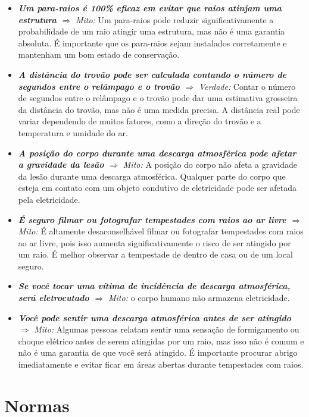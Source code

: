 \documentclass[a4paper, 12pt, onecolumn,singlespacing]{article}
\begin{document}
\begin{itemize}
		\item \textbf{\textit{Um para-raios é 100\% eficaz em evitar que raios atinjam uma estrutura $\Rightarrow$}}
		\textit{Mito:} Um para-raios pode reduzir significativamente a probabilidade de um raio atingir uma estrutura, mas não é uma garantia absoluta. É importante que os para-raios sejam instalados corretamente e mantenham um bom estado de conservação.
		
		\item \textbf{\textit{A distância do trovão pode ser calculada contando o número de segundos entre o relâmpago e o trovão $\Rightarrow$}}	\textit{Verdade: }Contar o número de segundos entre o relâmpago e o trovão pode dar uma estimativa grosseira da distância do trovão, mas não é uma medida precisa. A distância real pode variar dependendo de muitos fatores, como a direção do trovão e a temperatura e umidade do ar.
		
		\item \textbf{\textit{A posição do corpo durante uma descarga atmosférica pode afetar a gravidade da lesão $\Rightarrow$}}
		\textit{Mito: }A posição do corpo não afeta a gravidade da lesão durante uma descarga atmosférica. Qualquer parte do corpo que esteja em contato com um objeto condutivo de eletricidade pode ser afetada pela eletricidade.
		
		\item \textbf{\textit{É seguro filmar ou fotografar tempestades com raios ao ar livre $\Rightarrow$}}
		\textit{Mito: }É altamente desaconselhável filmar ou fotografar tempestades com raios ao ar livre, pois isso aumenta significativamente o risco de ser atingido por um raio. É melhor observar a tempestade de dentro de casa ou de um local seguro.
		
		\item \textbf{\textit{Se você tocar uma vítima de incidência de descarga atmosférica, será eletrocutado $\Rightarrow$}} \textit{Mito:} o corpo humano não armazena eletricidade.
		\item \textbf{\textit{Você pode sentir uma descarga atmosférica antes de ser atingido $\Rightarrow$}} \textit{Mito:} Algumas pessoas relatam sentir uma sensação de formigamento ou choque elétrico antes de serem atingidas por um raio, mas isso não é comum e não é uma garantia de que você será atingido. É importante procurar abrigo imediatamente e evitar ficar em áreas abertas durante tempestades com raios.
	\end{itemize}

	\section{Normas}
		
\end{document}

